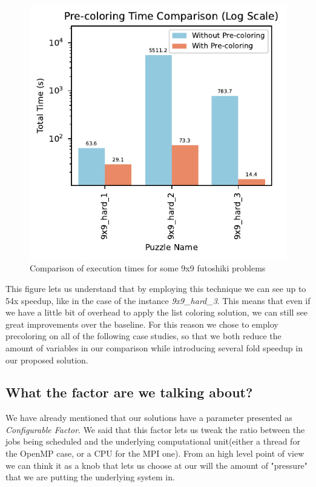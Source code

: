 \begin{figure}[htbp]
\centering
\includegraphics[width=0.9\linewidth]{imgs/precoloring_comparison.pdf}
\caption{Comparison of execution times for some 9x9 futoshiki problems}
\label{fig:precoloring_improvement}
\end{figure}


This figure lets us understand that by employing this technique we can see up to 54x speedup, like in the case of the instance \textit{9x9\_hard\_3}. This means that even if we have a little bit of overhead to apply the list coloring solution, we can still see great improvements over the baseline. For this reason we chose to employ precoloring on all of the following case studies, so that we both reduce the amount of variables in our comparison while introducing several fold speedup in our proposed solution.

\subsection{What the factor are we talking about?}
We have already mentioned that our solutions have a parameter presented as \textit{Configurable Factor}. We said that this factor lets us tweak the ratio between the jobs being scheduled and the underlying computational unit(either a thread for the OpenMP case, or a CPU for the MPI one). From an high level point of view we can think it as a knob that lets us choose at our will the amount of "pressure" that we are putting the underlying system in.

